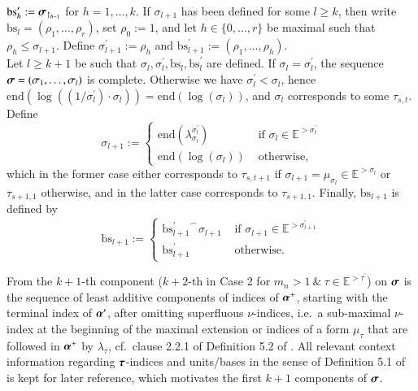 \documentclass[3p,10pt,times]{elsarticle}
\newcommand{\al}{\alpha}
\newcommand{\alvecpr}{{\vec{\al}'}}
\newcommand{\alvecpl}{{\vec{\al}^+}}
\newcommand{\la}{\lambda}
\newcommand{\sivec}{{\vec{\si}}}
\newcommand{\sipr}{\si^\prime}
\newcommand{\tauvec}{{\vec{\tau}}}
\newcommand{\taupr}{{\tau^\prime}}
\newcommand{\si}{\sigma}
\newcommand{\Ez}{{\mathbb E}}
\newcommand{\sumend}{{\mathrm{end}}}
\newcommand{\andsp}{\:\&\:}
\newcommand{\taucp}[1]{{\tau_{#1}}}
\def\vec#1{\mathchoice{\mbox{\boldmath$\displaystyle#1$}}
{\mbox{\boldmath$\textstyle#1$}}
{\mbox{\boldmath$\scriptstyle#1$}}
{\mbox{\boldmath$\scriptscriptstyle#1$}}}
\newcommand{\bs}{{\mathrm{bs}}}
\newcommand{\bspr}{\mathrm{bs}^\prime}
\begin{document}
\begin{defi}
$\bspr_h:=\sivec_{\restriction_{h-1}}$ for $h=1,\ldots,k$. If $\si_{l+1}$ has been defined for some $l\ge k$, 
then write $\bs_l=(\rho_1,\ldots,\rho_r)$, set $\rho_0:=1$, 
and let $h\in\{0,\ldots,r\}$ be maximal such that $\rho_h\le\si_{l+1}$. Define $\sipr_{l+1}:=\rho_h$ and $\bspr_{l+1}:=(\rho_1,\ldots,\rho_h)$.
\\[2mm]
Let $l\ge k+1$ be such that $\si_l,\sipr_l,\bs_l,\bspr_l$\index{$\bs$} are defined. If $\si_l=\sipr_l$, the sequence $\sivec=(\si_1,\ldots,\si_l)$ is 
complete. Otherwise we have $\sipr_l<\si_l$, hence $\sumend(\log((1/\sipr_l)\cdot\si_l))=\sumend(\log(\si_l))$, 
and $\si_l$ corresponds to some $\taucp{s,t}$.
Define 
\begin{equation}\label{lamlogit}
  \si_{l+1}:=\left\{\begin{array}{ll}
                      \sumend(\la^{\sipr_l}_{\si_l}) & \mbox{ if }\si_l\in\Ez^{>\sipr_l}\\[1mm]
                      \sumend(\log(\si_l)) & \mbox{ otherwise,}
                    \end{array}\right.
\end{equation}
which in the former case either corresponds to $\taucp{s,t+1}$ if $\si_{l+1}=\mu_{\si_l}\in\Ez^{>\si_l}$ or $\taucp{s+1,1}$ otherwise,
and in the latter case corresponds to $\taucp{s+1,1}$.
Finally, $\bs_{l+1}$ is defined by 
\[\bs_{l+1}:=\left\{\begin{array}{ll}
                      {\bspr_{l+1}}^\frown\si_{l+1} & \mbox{ if }\si_{l+1}\in\Ez^{>\sipr_{l+1}}\\[1mm]
                      \bspr_{l+1} & \mbox{ otherwise.}
                    \end{array}\right.\]
\end{defi}
\begin{rmk} From the $k+1$-th component ($k+2$-th in Case 2 for $m_n>1\andsp\tau\in\Ez^{>\taupr}$) on $\sivec$ is the sequence of least additive components of indices of $\alvecpl$, 
starting with the terminal index of $\alvecpr$, after omitting superfluous $\nu$-indices, i.e.\ a sub-maximal 
$\nu$-index at the beginning of the maximal extension or indices of a form $\mu_\tau$ 
that are followed in $\alvecpl$ by $\la_\tau$, cf.\ clause 2.2.1 of Definition 5.2 of \cite{CWc}.
All relevant context information regarding $\tauvec$-indices and units/bases in the sense of Definition 5.1 of \cite{CWc} is kept for 
later reference, which motivates the first $k+1$ components of $\sivec$.
\end{rmk}
\end{document}
